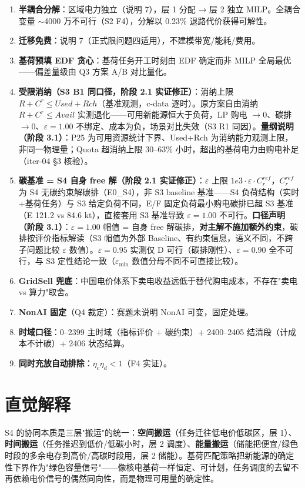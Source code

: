 \documentclass{internal-report}
\begin{document}
\begin{enumerate}
  \item \textbf{半耦合分解}：区域电力独立（说明 7），层 1 分配 → 层 2 独立 MILP。全耦合变量 $\sim$4000 万不可行（S2 F4），分解以 0.23\% 退路代价获得可解性。
  \item \textbf{迁移免费}：说明 7（正式限问题四适用），不建模带宽/能耗/费用。
  \item \textbf{基荷预填 EDF 贪心}：基荷任务开工时刻由 EDF 确定而非 MILP 全局最优——偏差量级由 Q3 方案 A/B 对比量化。
  \item \textbf{受限消纳（S3 B1 同口径，阶段 2.1 实证修正）}：消纳上限 $R+C^r\le Used+Rch$（基准观测，c-data 逐时）。原方案自由消纳 $R+C^r\le Avail$ 实测退化——可用新能源恒大于负荷，LP 购电 $\to0$、碳排 $\to0$、$\varepsilon=1.00$ 不绑定、成本为负，场景对比失效（S3 R1 同因）。\textbf{量纲说明（阶段 3.1）}：P25 为可用资源统计下界、Used+Rch 为消纳能力观测上限，非同一物理量；Quota 超消纳上限 30--63\% 小时，超出的基荷电力由购电补足（iter-04 §3 核验）。
  \item \textbf{碳基准 = S4 自身 free 解（阶段 2.1 实证修正）}：$\varepsilon$ 上限 $1e3\cdot\varepsilon\cdot C^{ref}_r$，$C^{ref}_r$ 为 S4 无碳约束解碳排（E0\_S4），非 S3 baseline 基准——S4 负荷结构（实时+基荷任务）与 S3 给定负荷不同，E/F 固定负荷最小购电碳排已超 S3 基准（E 121.2 vs 84.6 kt），直接套用 S3 基准导致 $\varepsilon=1.00$ 不可行。\textbf{口径声明（阶段 3.1）}：$\varepsilon=1.00$ 帽值 = 自身 free 解碳排，\textbf{对主解不施加额外约束}，碳排按评价指标解读（S3 帽值为外部 Baseline、有约束信息，语义不同，不跨子问题比较 $\varepsilon$ 数值）。$\varepsilon=0.95$ 实测仅 D 可行（碳排刚性）、$\varepsilon=0.90$ 全不可行，与 S3 定性结论一致（$\varepsilon_{\min}$ 数值分母不同不可直接比较）。
  \item \textbf{GridSell 兜底}：中国电价体系下卖电收益远低于替代购电成本，不存在"卖电 vs 算力"取舍。
  \item \textbf{NonAI 固定}（Q4 裁定）：赛题未说明 NonAI 可变，固定处理。
  \item \textbf{时域口径}：0--2399 主时域（指标评价 + 碳约束）+ 2400--2405 结清段（计成本不计碳）+ 2406 状态结算。
  \item \textbf{同时充放自动排除}：$\eta_c\eta_d<1$（F4 实证）。
\end{enumerate}

\section{直觉解释}

S4 的协同本质是三层"搬运"的统一：\textbf{空间搬运}（任务迁往低电价低碳区，层 1）、\textbf{时间搬运}（任务推迟到低价/低碳小时，层 2 调度）、\textbf{能量搬运}（储能把便宜/绿色时段的多余电存到高价/高碳时段用，层 2 储能）。基荷匹配策略把新能源的确定性下界作为"绿色容量信号"——像核电基荷一样恒定、可计划，任务调度的去留不再依赖电价信号的偶然同向性，而是物理可用量的确定性。
\end{document}
